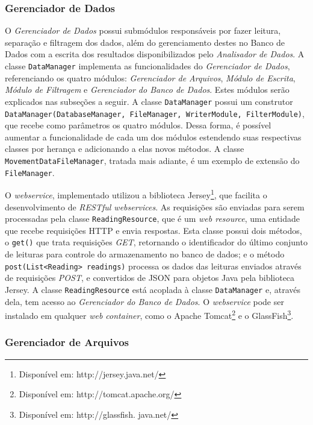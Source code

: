 \subsubsection{Gerenciador de Dados}
O \emph{Gerenciador de Dados} possui submódulos responsáveis por fazer leitura, separação e filtragem dos dados, além do gerenciamento destes no Banco de Dados com a escrita dos resultados disponibilizados pelo \emph{Analisador de Dados}. A classe \texttt{DataManager} implementa as funcionalidades do \emph{Gerenciador de Dados}, referenciando os quatro módulos: \emph{Gerenciador de Arquivos}, \emph{Módulo de Escrita}, \emph{Módulo de Filtragem} e \emph{Gerenciador do Banco de Dados}. Estes módulos serão explicados nas subseções a seguir. A classe \texttt{DataManager} possui um construtor \texttt{DataManager(DatabaseManager, FileManager, WriterModule, FilterModule)}, que recebe como parâmetros os quatro módulos. Dessa forma, é possível aumentar a funcionalidade de cada um dos módulos estendendo suas respectivas classes por herança e adicionando a elas novos métodos. A classe \texttt{MovementDataFileManager}, tratada mais adiante, é um exemplo de extensão do \texttt{FileManager}.

O \emph{webservice}, implementado utilizou a biblioteca Jersey\footnote{Disponível em: http://jersey.java.net/}, que facilita o desenvolvimento de \textit{RESTful webservices}. As requisições são enviadas para serem processadas pela classe \texttt{ReadingResource}, que é um \textit{web resource}, uma entidade que recebe requisições HTTP e envia respostas. Esta classe possui dois métodos, o \texttt{get()} que trata requisições \emph{GET}, retornando o identificador do último conjunto de leituras para controle do armazenamento no banco de dados; e o método \texttt{post(List<Reading> readings)} processa os dados das leituras enviados através de requisições \emph{POST}, e convertidos de JSON para objetos Java pela biblioteca Jersey. A classe \texttt{ReadingResource} está acoplada à classe \texttt{DataManager} e, através dela, tem acesso ao \emph{Gerenciador do Banco de Dados}. O \emph{webservice} pode ser instalado em qualquer \textit{web container}, como o Apache Tomcat\footnote{Disponível em: http://tomcat.apache.org/} e o GlassFish\footnote{Disponível em: http://glassfish.
java.net/}.

\subsubsection{Gerenciador de Arquivos}

